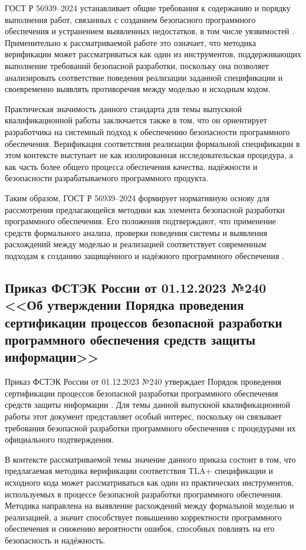 ГОСТ Р 56939--2024 устанавливает общие требования к содержанию и порядку
выполнения работ, связанных с созданием безопасного программного
обеспечения и устранением выявленных недостатков, в том числе
уязвимостей \cite{gost_56939_2024}. Применительно к рассматриваемой работе
это означает, что методика верификации может рассматриваться как один из
инструментов, поддерживающих выполнение требований безопасной разработки,
поскольку она позволяет анализировать соответствие поведения реализации
заданной спецификации и своевременно выявлять противоречия между моделью и
исходным кодом.

Практическая значимость данного стандарта для темы выпускной
квалификационной работы заключается также в том, что он ориентирует
разработчика на системный подход к обеспечению безопасности программного
обеспечения. Верификация соответствия реализации формальной спецификации в
этом контексте выступает не как изолированная исследовательская процедура,
а как часть более общего процесса обеспечения качества, надёжности и
безопасности разрабатываемого программного продукта.

Таким образом, ГОСТ Р 56939--2024 формирует нормативную основу для
рассмотрения предлагающейся методики как элемента безопасной разработки
программного обеспечения. Его положения подтверждают, что применение
средств формального анализа, проверки поведения системы и выявления
расхождений между моделью и реализацией соответствует современным
подходам к созданию защищённого и надёжного программного обеспечения
\cite{gost_56939_2024}.

\subsection{Приказ ФСТЭК России от 01.12.2023 №240 <<Об утверждении Порядка проведения сертификации процессов безопасной разработки программного обеспечения средств защиты информации>>}

Приказ ФСТЭК России от 01.12.2023 №240 утверждает Порядок проведения
сертификации процессов безопасной разработки программного обеспечения
средств защиты информации \cite{fstek_240_2023}. Для темы данной выпускной
квалификационной работы этот документ представляет особый интерес,
поскольку он связывает требования безопасной разработки программного
обеспечения с процедурами их официального подтверждения.

В контексте рассматриваемой темы значение данного приказа состоит в том,
что предлагаемая методика верификации соответствия TLA+ спецификации и
исходного кода может рассматриваться как один из практических инструментов,
используемых в процессе безопасной разработки программного обеспечения.
Методика направлена на выявление расхождений между формальной моделью и
реализацией, а значит способствует повышению корректности программного
обеспечения и снижению вероятности ошибок, способных повлиять на его
безопасность и надёжность.

